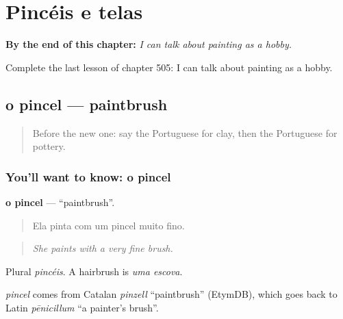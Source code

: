 
\chapter{Pincéis e telas}
\label{ch:pt-pinceis-e-telas}

\begin{chapteropening}
\textbf{By the end of this chapter:} \emph{I can talk about painting as a hobby.}

Complete the last lesson of chapter 505: I can talk about painting as a hobby.
\end{chapteropening}

\section[o pincel]{o pincel — paintbrush}

\label{lesson:PT-C505-pincel}



\begin{quote}
Before the new one: say the Portuguese for clay, then the Portuguese for pottery.
\end{quote}

\subsection*{You'll want to know: o pincel}
\textbf{o pincel} — \textquotedblleft{}paintbrush\textquotedblright{}.

\begin{quote}
Ela pinta com um pincel muito fino.
\end{quote}

\begin{quote}
\emph{She paints with a very fine brush.}
\end{quote}

Plural \emph{pincéis}. A hairbrush is \emph{uma escova}.

\begin{cousinweb}
\emph{pincel} comes from Catalan \emph{pinzell} \textquotedblleft{}paintbrush\textquotedblright{} (EtymDB), which goes back to Latin \emph{pēnicillum} \textquotedblleft{}a painter's brush\textquotedblright{}.
\end{cousinweb}

